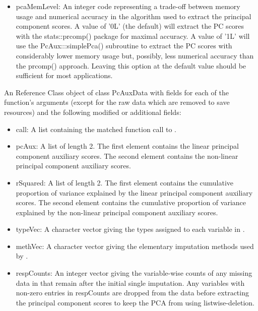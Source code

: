 \documentclass[letterpaper]{book}
\begin{document}
\begin{Details}
\begin{itemize}
\item pcaMemLevel:
An integer code representing a trade-off between memory usage and
numerical accuracy in the algorithm used to extract the principal
component scores. A value of '0L' (the default) will extract the PC
scores with the stats::prcomp() package for maximal accuracy. A
value of '1L' will use the PcAux:::simplePca() subroutine to extract
the PC scores with considerably lower memory usage but, possibly,
less numerical accuracy than the prcomp() approach. Leaving this
option at the default value should be sufficient for most
applications.


\end{itemize}

\end{Details}
%
\begin{Value}
An Reference Class object of class PcAuxData with fields for each of
the  function's arguments (except for the raw data
which are removed to save resources) and the following modified or
additional fields: 
\begin{itemize}

\item call: 
A list containing the matched function call to .

\item pcAux: 
A list of length 2. The first element contains the linear principal
component auxiliary scores. The second element contains the
non-linear principal component auxiliary scores.

\item rSquared: 
A list of length 2. The first element contains the cumulative
proportion of variance explained by the linear principal component
auxiliary scores. The second element contains the cumulative
proportion of variance explained by the non-linear principal
component auxiliary scores.

\item typeVec: 
A character vector giving the types assigned to each variable in
. 

\item methVec: 
A character vector giving the elementary imputation methods used
by .

\item respCounts: 
An integer vector giving the variable-wise counts of any missing
data in  that remain after the initial single
imputation. Any variables with non-zero entries in respCounts are
dropped from the data before extracting the principal component
scores to keep the PCA from using listwise-deletion.


\end{itemize}
\end{Value}
\end{document}
